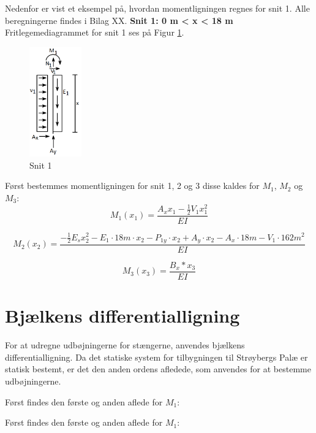 Nedenfor er vist et eksempel på, hvordan momentligningen regnes for snit 1. Alle beregningerne findes i Bilag XX.
\newline
\newline
\textbf{Snit 1: 0 m < x < 18 m}
\newline
Fritlegemediagrammet for snit 1 ses på Figur \ref{fig:snitetan}.
\begin{figure}[H]
	\centering
	\includegraphics[width=0.2\textwidth]{billeder/asnitet.png}
	\caption{Snit 1}
	\label{fig:snitetan}
\end{figure}


Først bestemmes momentligningen for snit 1, 2 og 3 disse kaldes for $M_1$, $M_2$ og $M_3$:
\begin{equation}
	M_1(x_1)=\frac{A_xx_1-\frac{1}{2}V_1x_1^2}{EI}
\end{equation}

\begin{equation}
	M_2(x_2)=\frac{-\frac{1}{2}E_s x_2^2 - E_1 \cdot 18m \cdot x_2 - P_{1y} \cdot x_2 + A_y \cdot x_2 - A_x \cdot 18m - V_1 \cdot 162m^2}{EI}
\end{equation}

\begin{equation}
	M_3(x_3)=\frac{B_x*x_3}{EI}
\end{equation}

\section{Bjælkens differentialligning}
For at udregne udbøjningerne for stængerne, anvendes bjælkens differentialligning. Da det statiske system for tilbygningen til Strøybergs Palæ er statisk bestemt, er det den anden ordens afledede, som anvendes for at bestemme udbøjningerne.
\newline

Først findes den første og anden aflede for $M_1$: 

Først findes den første og anden aflede for $M_1$: %

